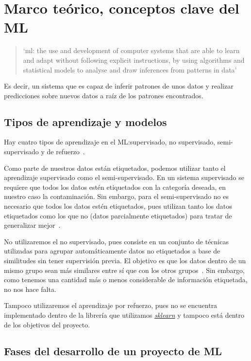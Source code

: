 \section{Marco teórico, conceptos clave del ML}

\begin{quote}
    `\gls{ml}: the use and development of computer systems that are able to learn and adapt without following explicit instructions, by using algorithms and statistical models to analyse and draw inferences from patterns in data'\ \cite{machinel18:online}
\end{quote}

Es decir, un sistema que es capaz de inferir patrones de unos datos y realizar predicciones sobre nuevos datos a raíz de los patrones encontrados. 


\subsection{Tipos de aprendizaje y modelos}

Hay cuatro tipos de aprendizaje en el ML:\@ supervisado, no supervisado, semi-supervisado y de refuerzo\ \cite{homl56}.

Como parte de nuestros datos están etiquetados, podemos utilizar tanto el aprendizaje supervisado como el semi-supervisado. En un sistema supervisado se requiere que todos los datos estén etiquetados con la categoría deseada, en nuestro caso la contaminación. Sin embargo, para el semi-supervisado no es necesario que todos los datos estén etiquetados, pues utilizan tanto los datos etiquetados como los que no (datos parcialmente etiquetados) para tratar de generalizar mejor\ \cite{homl56}.

No utilizaremos el no supervisado, pues consiste en un conjunto de técnicas utilizadas para agrupar automáticamente datos no etiquetados a base de similitudes sin tener supervisión previa. El objetivo es que los datos dentro de un mismo grupo sean más similares entre sí que con los otros grupos\ \cite{Clustera13:online}. Sin embargo, como tenemos una cantidad más o menos considerable de información etiquetada, no nos hace falta.

Tampoco utilizaremos el aprendizaje por refuerzo, pues no se encuentra implementado dentro de la librería que utilizamos \textit{\href{https://scikit-learn.org/stable/}{sklearn}} y tampoco está dentro de los objetivos del proyecto.


\subsection{Fases del desarrollo de un proyecto de ML}

